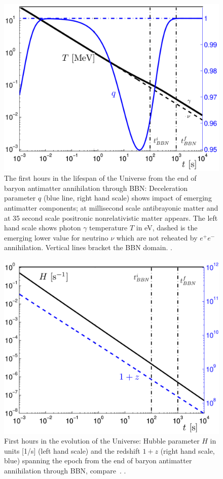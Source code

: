 \begin{figure}
\centerline{\includegraphics[width=0.90\linewidth]{01-introduction/Figures/TqBBN.png}}
\caption{The first hours in the lifespan of the Universe from the end of baryon antimatter annihilation through BBN: Deceleration parameter $q$ (blue line, right hand scale) shows impact of emerging antimatter components; at millisecond scale antibrayonic matter and at 35 second scale positronic nonrelativistic matter appears. The left hand scale shows photon $\gamma$ temperature $T$ in eV, dashed is the emerging lower value for neutrino $\nu$ which are not reheated by $e^+e^-$ annihilation. Vertical lines bracket the BBN domain. . 
\label{fig:BBN}}
\end{figure}

\begin{figure}
\centerline{\includegraphics[width=0.90\linewidth]{01-introduction/Figures/HzBBN.png}} 
\caption{First hours in the evolution of the Universe: Hubble parameter $H$ in units [1/s] (left hand scale) and the redshift $1+z$ (right hand scale, blue) spanning the epoch from the end of baryon antimatter annihilation through BBN, compare~. .
\label{fig:BBN1}}
\end{figure}


